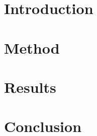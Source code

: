 \documentclass[draft, twoside]{article}
\title{\todo[inline]{Bedenk een titel.}}
\author{
	Laura van de Braak (s2165341)\and
    Jelmer van der Linde (s1772791)\and
    Laura Baakman (s1869140)}
\begin{document}
\listoftodos
\clearpage

\maketitle



\section{Introduction}


\section{Method}


\section{Results}


\section{Conclusion}


\printbibliography
\end{document}
